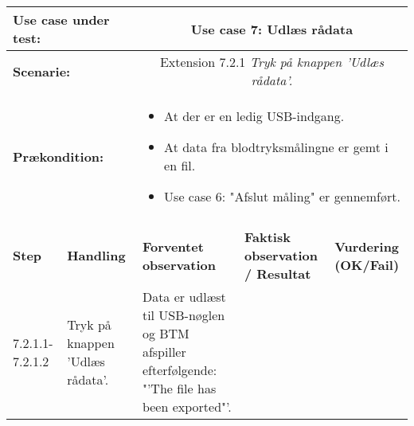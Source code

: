\begin{tabular}{|p{1cm}|p{3cm}|p{4cm}|p{4cm}|p{2cm}|}
\hline
\multicolumn{2}{|p{3cm}|}{\textbf{Use case under test:}} & \multicolumn{3}{c|}{Use case 7: Udlæs rådata} \\\hline

\multicolumn{2}{|p{3cm}|}{\textbf{Scenarie:}} & \multicolumn{3}{c|}{Extension 7.2.1 \textit{Tryk på knappen 'Udlæs rådata'.}} \\\hline

\multicolumn{2}{|p{3cm}|}{\textbf{Prækondition:}}  & \multicolumn{3}{l|}{\parbox{0.6\textwidth}{
\begin{itemize}[label=$\circ$]
\item At der er en ledig USB-indgang.
\item At data fra blodtryksmålingne er gemt i en fil. 
\item Use case 6: "Afslut måling" er gennemført. 
\end{itemize} }}\\\hline

\multicolumn{5}{|c|}{} \\\hline

\textbf{Step} & \textbf{Handling} & \textbf{Forventet observation} & \textbf{Faktisk observation / Resultat} & \textbf{Vurdering (OK/Fail)}\\\hline

7.2.1.1-7.2.1.2 & Tryk på knappen 'Udlæs rådata'. & Data er udlæst til USB-nøglen og BTM afspiller efterfølgende: "'The file has been exported"'. & & \\\hline

\end{tabular}

